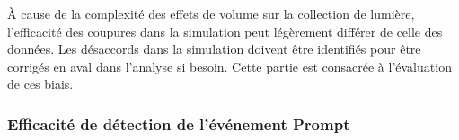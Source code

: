
À cause de la complexité des effets de volume sur la collection de lumière, l'efficacité des coupures dans la simulation peut légèrement différer de celle  des données. Les désaccords dans la simulation doivent être identifiés pour être corrigés en aval dans l'analyse si besoin. Cette partie est consacrée à l'évaluation de ces biais.\\

\subsubsection*{Efficacité de détection de l'événement Prompt}

